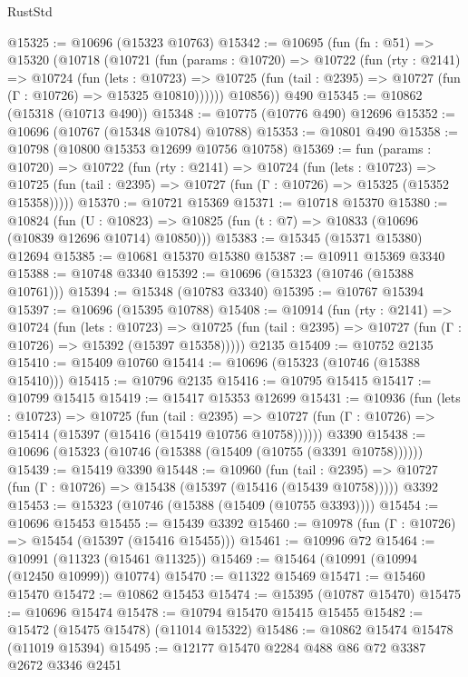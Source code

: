 \begin{lexlean}{RustStd}
\begin{coremodule}
@15325 := @10696 (@15323 @10763)
@15342 := @10695
    (fun (fn : @51) =>
    @15320
      (@10718
        (@10721
          (fun (params : @10720) =>
          @10722
            (fun (rty : @2141) =>
            @10724
              (fun (lets : @10723) =>
              @10725 (fun (tail : @2395) => @10727 (fun (Γ : @10726) => @15325 @10810))))))
        @10856))
    @490
@15345 := @10862 (@15318 (@10713 @490))
@15348 := @10775 (@10776 @490) @12696
@15352 := @10696 (@10767 (@15348 @10784) @10788)
@15353 := @10801 @490
@15358 := @10798 (@10800 @15353 @12699 @10756 @10758)
@15369 := fun (params : @10720) =>
  @10722
    (fun (rty : @2141) =>
    @10724
      (fun (lets : @10723) =>
      @10725 (fun (tail : @2395) => @10727 (fun (Γ : @10726) => @15325 (@15352 @15358)))))
@15370 := @10721 @15369
@15371 := @10718 @15370
@15380 := @10824
    (fun (U : @10823) => @10825 (fun (t : @7) => @10833 (@10696 (@10839 @12696 @10714) @10850)))
@15383 := @15345 (@15371 @15380) @12694
@15385 := @10681 @15370 @15380
@15387 := @10911 @15369 @3340
@15388 := @10748 @3340
@15392 := @10696 (@15323 (@10746 (@15388 @10761)))
@15394 := @15348 (@10783 @3340)
@15395 := @10767 @15394
@15397 := @10696 (@15395 @10788)
@15408 := @10914
    (fun (rty : @2141) =>
    @10724
      (fun (lets : @10723) =>
      @10725 (fun (tail : @2395) => @10727 (fun (Γ : @10726) => @15392 (@15397 @15358)))))
    @2135
@15409 := @10752 @2135
@15410 := @15409 @10760
@15414 := @10696 (@15323 (@10746 (@15388 @15410)))
@15415 := @10796 @2135
@15416 := @10795 @15415
@15417 := @10799 @15415
@15419 := @15417 @15353 @12699
@15431 := @10936
    (fun (lets : @10723) =>
    @10725
      (fun (tail : @2395) =>
      @10727 (fun (Γ : @10726) => @15414 (@15397 (@15416 (@15419 @10756 @10758))))))
    @3390
@15438 := @10696 (@15323 (@10746 (@15388 (@15409 (@10755 (@3391 @10758))))))
@15439 := @15419 @3390
@15448 := @10960
    (fun (tail : @2395) => @10727 (fun (Γ : @10726) => @15438 (@15397 (@15416 (@15439 @10758)))))
    @3392
@15453 := @15323 (@10746 (@15388 (@15409 (@10755 @3393))))
@15454 := @10696 @15453
@15455 := @15439 @3392
@15460 := @10978 (fun (Γ : @10726) => @15454 (@15397 (@15416 @15455)))
@15461 := @10996 @72
@15464 := @10991 (@11323 (@15461 @11325))
@15469 := @15464 (@10991 (@10994 (@12450 @10999)) @10774)
@15470 := @11322 @15469
@15471 := @15460 @15470
@15472 := @10862 @15453
@15474 := @15395 (@10787 @15470)
@15475 := @10696 @15474
@15478 := @10794 @15470 @15415 @15455
@15482 := @15472 (@15475 @15478) (@11014 @15322)
@15486 := @10862 @15474 @15478 (@11019 @15394)
@15495 := @12177 @15470 @2284 @488 @86 @72 @3387 @2672 @3346 @2451

\end{coremodule}
\end{lexlean}
